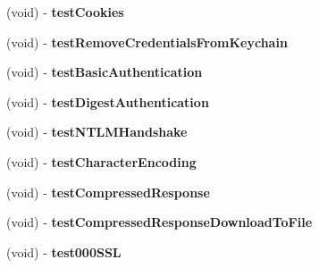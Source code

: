\begin{DoxyCompactItemize}
\item 
\hypertarget{interface_a_s_i_h_t_t_p_request_tests_aacb09654f3e66aa17656bbde8866d97d}{
(void) -\/ {\bfseries test\-Cookies}}
\label{interface_a_s_i_h_t_t_p_request_tests_aacb09654f3e66aa17656bbde8866d97d}

\item 
\hypertarget{interface_a_s_i_h_t_t_p_request_tests_ab55f5b89f90f18669e5abe8219ea227d}{
(void) -\/ {\bfseries test\-Remove\-Credentials\-From\-Keychain}}
\label{interface_a_s_i_h_t_t_p_request_tests_ab55f5b89f90f18669e5abe8219ea227d}

\item 
\hypertarget{interface_a_s_i_h_t_t_p_request_tests_a95ec0edfa8e276c8e701b57e76d20c03}{
(void) -\/ {\bfseries test\-Basic\-Authentication}}
\label{interface_a_s_i_h_t_t_p_request_tests_a95ec0edfa8e276c8e701b57e76d20c03}

\item 
\hypertarget{interface_a_s_i_h_t_t_p_request_tests_a66b1d1d52e3faaadb334efa3ca93351e}{
(void) -\/ {\bfseries test\-Digest\-Authentication}}
\label{interface_a_s_i_h_t_t_p_request_tests_a66b1d1d52e3faaadb334efa3ca93351e}

\item 
\hypertarget{interface_a_s_i_h_t_t_p_request_tests_a42b76a1c974d5b1b8ff1a22a20381b06}{
(void) -\/ {\bfseries test\-N\-T\-L\-M\-Handshake}}
\label{interface_a_s_i_h_t_t_p_request_tests_a42b76a1c974d5b1b8ff1a22a20381b06}

\item 
\hypertarget{interface_a_s_i_h_t_t_p_request_tests_ae25e5af72786306a726678b3e50efa71}{
(void) -\/ {\bfseries test\-Character\-Encoding}}
\label{interface_a_s_i_h_t_t_p_request_tests_ae25e5af72786306a726678b3e50efa71}

\item 
\hypertarget{interface_a_s_i_h_t_t_p_request_tests_ae884e3724fa16e86e2c9f202fafb0832}{
(void) -\/ {\bfseries test\-Compressed\-Response}}
\label{interface_a_s_i_h_t_t_p_request_tests_ae884e3724fa16e86e2c9f202fafb0832}

\item 
\hypertarget{interface_a_s_i_h_t_t_p_request_tests_ad9fe5125c3c071c35369d0df17222250}{
(void) -\/ {\bfseries test\-Compressed\-Response\-Download\-To\-File}}
\label{interface_a_s_i_h_t_t_p_request_tests_ad9fe5125c3c071c35369d0df17222250}

\item 
\hypertarget{interface_a_s_i_h_t_t_p_request_tests_a91af84b41f3a46f64d16095adb340214}{
(void) -\/ {\bfseries test000\-S\-S\-L}}
\label{interface_a_s_i_h_t_t_p_request_tests_a91af84b41f3a46f64d16095adb340214}


\end{DoxyCompactItemize}
